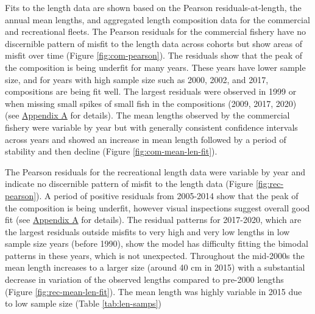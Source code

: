 \documentclass[11pt,
  english,
  a4paper,
]{article}
\begin{document}
Fits to the length data are shown based on the Pearson residuals-at-length, the annual mean lengths, and aggregated length composition data for the commercial and recreational fleets. The Pearson residuals for the commercial fishery have no discernible pattern of misfit to the length data across cohorts but show areas of misfit over time (Figure \ref{fig:com-pearson}). The residuals show that the peak of the composition is being underfit for many years. These years have lower sample size, and for years with high sample size such as 2000, 2002, and 2017, compositions are being fit well. The largest residuals were observed in 1999 or when missing small spikes of small fish in the compositions (2009, 2017, 2020) (see {\protect\hyperlink{append_a}{Appendix A}\leavevmode\tagmcend\tagstructend} for details). The mean lengths observed by the commercial fishery were variable by year but with generally consistent confidence intervals across years and showed an increase in mean length followed by a period of stability and then decline (Figure \ref{fig:com-mean-len-fit}).

\leavevmode\tagmcend\tagstructend\par


The Pearson residuals for the recreational length data were variable by year and indicate no discernible pattern of misfit to the length data (Figure \ref{fig:rec-pearson}). A period of positive residuals from 2005-2014 show that the peak of the composition is being underfit, however visual inspections suggest overall good fit (see {\protect\hyperlink{append_a}{Appendix A}\leavevmode\tagmcend\tagstructend} for details). The residual patterns for 2017-2020, which are the largest residuals outside misfits to very high and very low lengths in low sample size years (before 1990), show the model has difficulty fitting the bimodal patterns in these years, which is not unexpected. Throughout the mid-2000s the mean length increases to a larger size (around 40 cm in 2015) with a substantial decrease in variation of the observed lengths compared to pre-2000 lengths (Figure \ref{fig:rec-mean-len-fit}). The mean length was highly variable in 2015 due to low sample size (Table \ref{tab:len-samps})

\leavevmode\tagmcend\tagstructend\par

\end{document}
